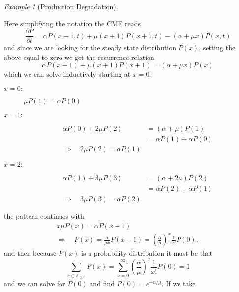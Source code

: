 \documentclass[a4paper]{article}
\theoremstyle{plain}
\theoremstyle{definition}
\theoremstyle{remark}
\newtheorem*{example}{Example}
\begin{document}
\begin{example}[Production Degradation]
\begin{center}
  \end{center}
  Here simplifying the notation the CME reads
  \[
    \frac{\partial P}{\partial t}
    = \alpha P(x-1, t)  + \mu (x+1) P(x+1, t) - (\alpha + \mu x) P(x, t)
  \]
  and since we are looking for the steady state distribution $P(x)$, setting
  the above equal to zero we get the recurrence relation
  \[
    \alpha P(x-1) + \mu (x+1)  P(x+1) = (\alpha + \mu x) P(x)
  \]
  which we can solve inductively starting at $x = 0$:
  \begin{description}
    \item[$x=0:$] $\mu P(1) = \alpha P(0)$
    \item[$x=1:$] \begin{align*}
        \alpha P(0) + 2\mu P(2) &= (\alpha + \mu) P(1) \\
          &= \alpha P(1) + \alpha P(0) \\
        \Rightarrow \quad 2\mu P(2) = \alpha P(1)
    \end{align*}
    \item[$x=2:$] \begin{align*}
        \alpha P(1) + 3\mu P(3) &= (\alpha + 2\mu) P(2) \\
          &= \alpha P(2) + \alpha P(1) \\
        \Rightarrow \quad 3\mu P(3) = \alpha P(2)
    \end{align*}
  \end{description}
  the pattern continues with
  \begin{gather*}
    x\mu P(x) = \alpha P(x-1) \\
    \Rightarrow \quad
    P(x) = \frac{\alpha}{\mu x} P(x-1) = 
    \left( \frac{\alpha}{\mu} \right)^x \frac{1}{x!} P(0),
  \end{gather*}
  and then because $P(x)$ is a probability distribution it must be that
  \[
    \sum_{x \in \mathbb{Z}_{\geq 0}} P(x) 
      = \sum_{x = 0}^\infty \left( \frac{\alpha}{\mu} \right)^x \frac{1}{x!}
      P(0) = 1
  \]
  and we can solve for $P(0)$ and find $P(0) = e^{-\alpha / \mu}$. If we take

\end{example}
\end{document}
